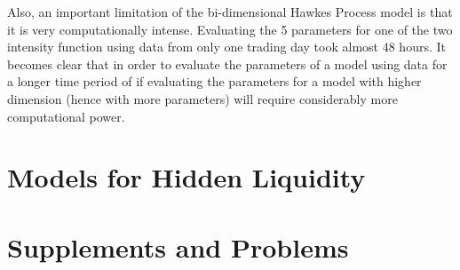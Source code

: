 Also, an important limitation of the bi-dimensional Hawkes Process model is that it is very computationally intense. Evaluating the 5 parameters for one of the two intensity function using data from only one trading day took almost 48 hours. It becomes clear that in order to evaluate the parameters of a model using data for a longer time period of if evaluating the parameters for a model with higher dimension (hence with more parameters) will require considerably more computational power. 

\section{Models for Hidden Liquidity}

\section{Supplements and Problems} 

